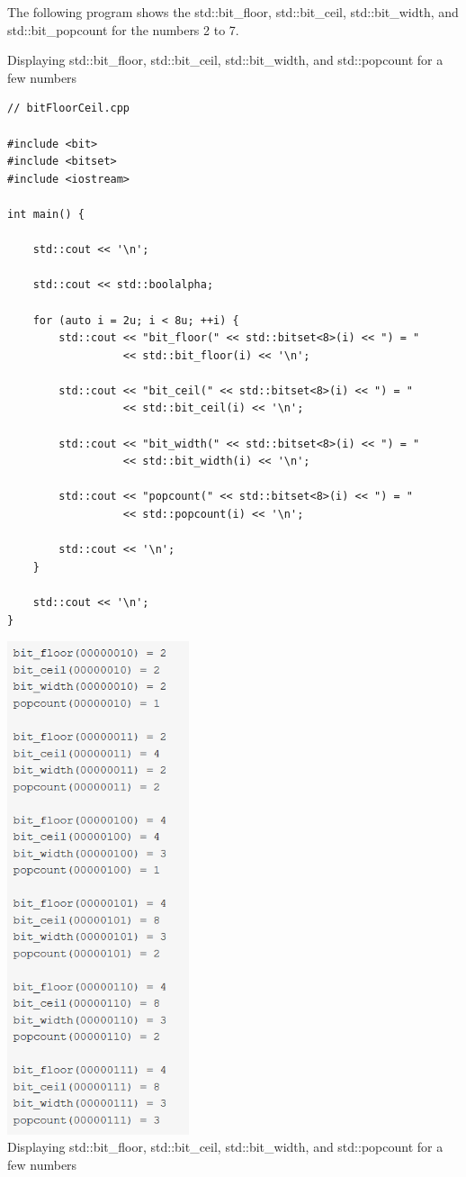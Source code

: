 The following program shows the std::bit\_floor, std::bit\_ceil, std::bit\_width, and std::bit\_popcount for the numbers 2 to 7.

\noindent
Displaying std::bit\_floor, std::bit\_ceil, std::bit\_width, and std::popcount for a few numbers
\begin{lstlisting}[style=styleCXX]
// bitFloorCeil.cpp

#include <bit>
#include <bitset>
#include <iostream>

int main() {
	
	std::cout << '\n';
	
	std::cout << std::boolalpha;
	
	for (auto i = 2u; i < 8u; ++i) {
		std::cout << "bit_floor(" << std::bitset<8>(i) << ") = "
		          << std::bit_floor(i) << '\n';
		
		std::cout << "bit_ceil(" << std::bitset<8>(i) << ") = "
		          << std::bit_ceil(i) << '\n';
		
		std::cout << "bit_width(" << std::bitset<8>(i) << ") = "
		          << std::bit_width(i) << '\n';
		
		std::cout << "popcount(" << std::bitset<8>(i) << ") = "
		          << std::popcount(i) << '\n';
		
		std::cout << '\n';
	}

	std::cout << '\n';
}
\end{lstlisting}

\begin{center}
\includegraphics[width=0.4\textwidth]{content/3/chapter5/images/1-7.png}\\
Displaying std::bit\_floor, std::bit\_ceil, std::bit\_width, and std::popcount for a few numbers
\end{center}

